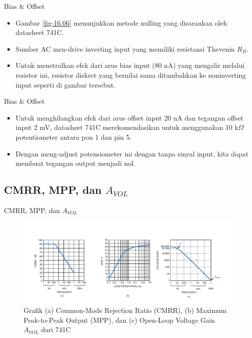 \begin{frame}{Bias \& Offset}
	\begin{itemize}
		\item Gambar \ref{fig-16.06} menunjukkan metode nulling yang disarankan oleh datasheet 741C.
		\item Sumber AC men-drive inverting input yang memiliki resistansi Thevenin $ R_B $.
		\item Untuk menetralkan efek dari arus bias input (80 nA) yang mengalir melalui resistor ini, resistor diskret yang bernilai sama ditambahkan ke noninverting input seperti di gambar tersebut.
	\end{itemize}
\end{frame}

\begin{frame}{Bias \& Offset}
	\begin{itemize}
		\item Untuk menghilangkan efek dari arus offset input 20 nA dan tegangan offset input 2 mV, datasheet 741C merekomendasikan untuk menggunakan 10 k$ \Omega $ potentiometer antara pon 1 dan pin 5.
		\item Dengan meng-adjust potensiometer ini dengan tanpa sinyal input, kita dapat membuat tegangan output menjadi nol.
	\end{itemize}
\end{frame}

\subsection{CMRR, MPP, dan $A_{VOL}$}

\begin{frame}{CMRR, MPP, dan $A_{VOL}$}
	\begin{figure}
		\centering
		\includegraphics[width=\linewidth]{gambar/fig-16.07}
		\caption{Grafik (a) Common-Mode Rejection Ratio (CMRR), (b) Maximum Peak-to-Peak Output (MPP), dan (c) Open-Loop Voltage Gain $A_{VOL}$ dari 741C}
		\label{fig-16.07}
	\end{figure}
\end{frame}

